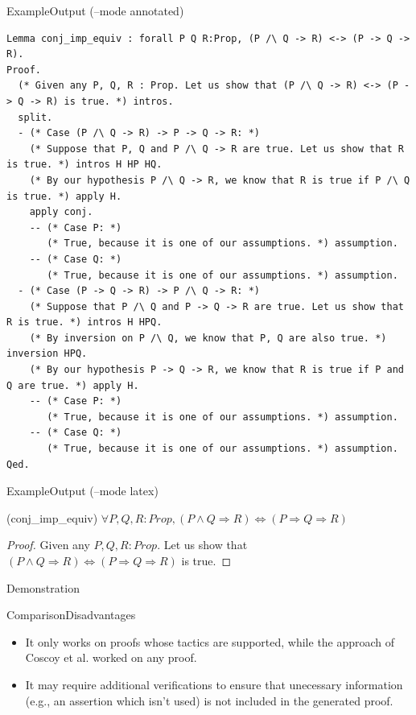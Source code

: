 \documentclass[pdf]{beamer}
\begin{document}
\begin{frame}[fragile]{Example}{Output (--mode annotated)}
\begin{adjustbox}{minipage=\linewidth,bgcolor=coqatoo-gray,trim=-3pt 5pt -3pt 5pt}
\begin{lstlisting}[label=listing:output]
Lemma conj_imp_equiv : forall P Q R:Prop, (P /\ Q -> R) <-> (P -> Q -> R).
Proof.
  (* Given any P, Q, R : Prop. Let us show that (P /\ Q -> R) <-> (P -> Q -> R) is true. *) intros.
  split.
  - (* Case (P /\ Q -> R) -> P -> Q -> R: *) 
    (* Suppose that P, Q and P /\ Q -> R are true. Let us show that R is true. *) intros H HP HQ.
    (* By our hypothesis P /\ Q -> R, we know that R is true if P /\ Q  is true. *) apply H.
    apply conj.
    -- (* Case P: *)
       (* True, because it is one of our assumptions. *) assumption.
    -- (* Case Q: *)
       (* True, because it is one of our assumptions. *) assumption.
  - (* Case (P -> Q -> R) -> P /\ Q -> R: *)
    (* Suppose that P /\ Q and P -> Q -> R are true. Let us show that R is true. *) intros H HPQ.
    (* By inversion on P /\ Q, we know that P, Q are also true. *) inversion HPQ.
    (* By our hypothesis P -> Q -> R, we know that R is true if P and Q are true. *) apply H.
    -- (* Case P: *)
       (* True, because it is one of our assumptions. *) assumption.
    -- (* Case Q: *)
       (* True, because it is one of our assumptions. *) assumption.
Qed.
\end{lstlisting}
\end{adjustbox}
\end{frame}

\begin{frame}{Example}{Output (--mode latex)}
    \begin{lemma} (conj\_imp\_equiv) $\forall P, Q, R : Prop, (P \land Q \Rightarrow R) \Leftrightarrow (P \Rightarrow Q \Rightarrow R)$
    \end{lemma}
    \begin{proof}
        Given any $P, Q, R : Prop$. Let us show that $(P \land Q \Rightarrow R) \Leftrightarrow (P \Rightarrow Q \Rightarrow R)$ is true.
    \end{proof}
\end{frame}

\begin{frame}
    \Huge \center Demonstration
\end{frame}

\begin{frame}{Comparison}{Disadvantages}
    \begin{itemize}
        \item{It only works on proofs whose tactics are supported, while the approach of Coscoy et al. worked on any proof.}
        \item{It may require additional verifications to ensure that unecessary information (e.g., an assertion which isn't used) is not included in the generated proof.}
    \end{itemize}
\end{frame}
\end{document}
